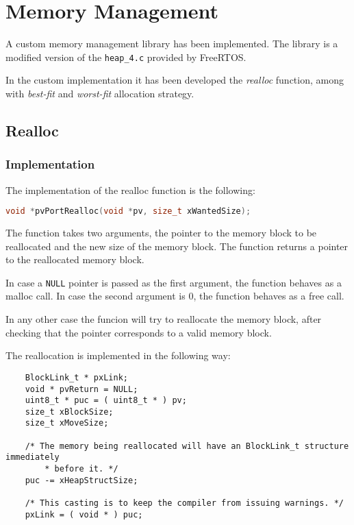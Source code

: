 \section{Memory Management}

A custom memory management library has been implemented. The library is a modified version of the \texttt{heap\_4.c} provided by FreeRTOS.

In the custom implementation it has been developed the \textit{realloc} function, among with \textit{best-fit} and \textit{worst-fit} allocation strategy.

\subsection{Realloc}
    \subsubsection{Implementation}
    The implementation of the realloc function is the following:

    \begin{lstlisting}[language=c]
    void *pvPortRealloc(void *pv, size_t xWantedSize);
    \end{lstlisting}

    The function takes two arguments, the pointer to the memory block to be reallocated and the new size of the memory block. The function returns a pointer to the reallocated memory block.

    In case a \texttt{NULL} pointer is passed as the first argument, the function behaves as a malloc call. In case the second argument is 0, the function behaves as a free call.
    
    In any other case the funcion will try to reallocate the memory block, after checking that the pointer corresponds to a valid memory block.

    The reallocation is implemented in the following way:

    \begin{codebox}
    \begin{lstlisting}
    BlockLink_t * pxLink;
    void * pvReturn = NULL;
    uint8_t * puc = ( uint8_t * ) pv;
    size_t xBlockSize;
    size_t xMoveSize;

    /* The memory being reallocated will have an BlockLink_t structure immediately
        * before it. */
    puc -= xHeapStructSize;

    /* This casting is to keep the compiler from issuing warnings. */
    pxLink = ( void * ) puc;
    \end{lstlisting}
    \end{codebox}


